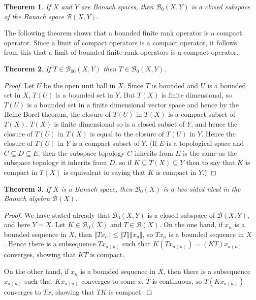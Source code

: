 \documentclass{article}
\newcommand{\norm}[1]{\Vert #1 \Vert}
\newtheorem{theorem}{Theorem}
\begin{document}
\begin{theorem}
If $X$ and $Y$ are Banach spaces, then
$\mathscr{B}_0(X,Y)$ is a closed subspace of the Banach space $\mathscr{B}(X,Y)$.
\end{theorem} 



The following theorem shows that a bounded finite rank operator is a compact operator. Since a limit of compact operators is a compact operator, it follows from this that
a limit of bounded finite rank operators is a compact operator.


\begin{theorem}
If $T \in \mathscr{B}_{00}(X,Y)$ then $T \in \mathscr{B}_0(X,Y)$. 
\label{finiterankdensecompact}
\end{theorem}
\begin{proof}
Let $U$ be the open unit ball in $X$. Since $T$ is bounded  and $U$ is a bounded set in $X$, $T(U)$ is a bounded set in $Y$. But $T(X)$
is finite dimensional, so $T(U)$ is a bounded set in a finite dimensional vector space and hence by the Heine-Borel theorem,
 the closure of $T(U)$ in $T(X)$ is a compact subset of $T(X)$. $T(X)$ is finite
dimensional so is a closed subset of $Y$, and hence the closure of $T(U)$ in $T(X)$ is equal to the  closure  of $T(U)$ in $Y$. Hence the closure of $T(U)$ in $Y$
is a compact subset
of $Y$. (If $E$ is a topological space and $C \subseteq D \subseteq E$, then the subspace topology $C$ inherits from $E$ is the same as the subspace
topology it inherits from $D$, so if $K \subseteq T(X) \subseteq Y$ then to say that $K$ is compact in $T(X)$ is equivalent to saying that $K$ is compact in $Y$.)
\end{proof}

\begin{theorem}
If $X$ is a Banach space, then $\mathscr{B}_0(X)$ is a  two sided ideal in the Banach algebra $\mathscr{B}(X)$.
\end{theorem}
\begin{proof}
We have stated already that $\mathscr{B}_0(X,Y)$ is a closed subspace of $\mathscr{B}(X,Y)$, and here $Y=X$.
Let $K \in \mathscr{B}_0(X)$ and $T \in \mathscr{B}(X)$. On the one hand, if $x_n$ is a bounded sequence in $X$, then $\norm{Tx_n} \leq \norm{T} \norm{x_n}$, so
$Tx_n$ is a bounded sequence in $X$. Hence there is a subsequence $Tx_{a(n)}$ such that $K(Tx_{a(n)})=(KT)x_{a(n)}$ converges, showing that
$KT$ is compact.

On the other hand, if $x_n$ is a bounded sequence in $X$, then there is a subsequence $x_{a(n)}$ such that
$Kx_{a(n)}$ converges to some $x$. $T$ is continuous, so $T(Kx_{a(n)})$ converges  to $Tx$,
showing that $TK$ is compact.
\end{proof}
\end{document}
